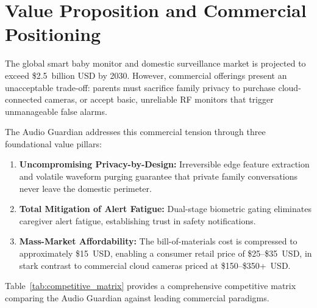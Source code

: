 \documentclass[12pt, a4paper]{report}
\begin{document}
\section{Value Proposition and Commercial Positioning}
The global smart baby monitor and domestic surveillance market is projected to exceed \$2.5~billion USD by 2030. However, commercial offerings present an unacceptable trade-off: parents must sacrifice family privacy to purchase cloud-connected cameras, or accept basic, unreliable RF monitors that trigger unmanageable false alarms.

The Audio Guardian addresses this commercial tension through three foundational value pillars:
\begin{enumerate}
    \item \textbf{Uncompromising Privacy-by-Design:} Irreversible edge feature extraction and volatile waveform purging guarantee that private family conversations never leave the domestic perimeter.
    \item \textbf{Total Mitigation of Alert Fatigue:} Dual-stage biometric gating eliminates caregiver alert fatigue, establishing trust in safety notifications.
    \item \textbf{Mass-Market Affordability:} The bill-of-materials cost is compressed to approximately \$15~USD, enabling a consumer retail price of \$25--\$35~USD, in stark contrast to commercial cloud cameras priced at \$150--\$350+~USD.
\end{enumerate}

Table~\ref{tab:competitive_matrix} provides a comprehensive competitive matrix comparing the Audio Guardian against leading commercial paradigms.
\end{document}
